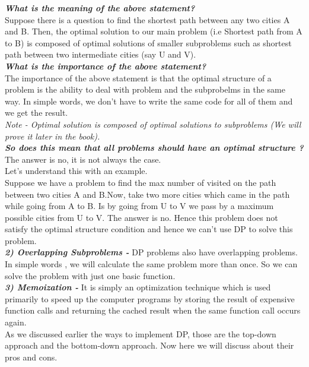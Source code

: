 \documentclass[12pt]{book}
\begin{document}
\textbf{\textit{What is the meaning of the above statement?}}\\
Suppose there is a question to find the shortest path between any two cities A and B. Then, the optimal solution to our main problem (i.e Shortest path from A to B)  is composed of optimal solutions of smaller subproblems such as shortest path between two intermediate cities (say U and V).\\

\textbf{\textit{What is the importance of the above statement?}}\\
The importance of the above statement is that the optimal structure of a problem is the ability to deal with problem and the subprobelms in the same way. In simple words, we don’t have to write the same code for all of them and we get the result.\\
\textit{Note - Optimal solution is composed of optimal solutions to subproblems (We will prove it later in the book).}\\

\textbf{\textit{So does this mean that all problems should have an optimal structure ?}}\\
The answer is no, it is not always the case.\\
Let’s understand this with an example.\\
Suppose we have a problem  to find the max number of visited on the path between two cities A and B.Now, take two more cities which came in the path while going from A to B. Is by going from U to V we pass by a maximum possible cities from U to V. The answer is no.
Hence this problem does not satisfy the optimal structure condition and hence we can’t use DP to solve this problem.\\

		\textbf{\textit{\large{2)  Overlapping Subproblems -}}} DP problems also have overlapping problems. In simple words , we will calculate the same problem more than once. So we can solve the problem with just one basic function.\\

		\textbf{\textit{\large{3)  Memoization -}}} It is simply an optimization technique which is used primarily to speed up the computer programs by storing the result of expensive function calls and returning the cached result when the same function call occurs again.\\

As we discussed earlier the ways to implement DP, those are the top-down approach and the bottom-down approach. Now here we will discuss about their pros and cons.\\
\end{document}
